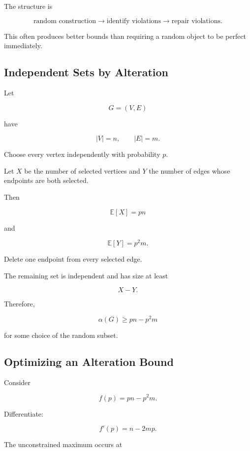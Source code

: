 The structure is

\[
\boxed{
\text{random construction}
\longrightarrow
\text{identify violations}
\longrightarrow
\text{repair violations}.
}
\]

This often produces better bounds than requiring a random object to be
perfect immediately.

\subsection{Independent Sets by Alteration}
\label{subsec:independent-set-alteration}

Let

\[
G=(V,E)
\]

have

\[
|V|=n,
\qquad
|E|=m.
\]

Choose every vertex independently with probability \(p\).

Let \(X\) be the number of selected vertices and \(Y\) the number of
edges whose endpoints are both selected.

Then

\[
\mathbb{E}[X]=pn
\]

and

\[
\mathbb{E}[Y]=p^2m.
\]

Delete one endpoint from every selected edge.

The remaining set is independent and has size at least

\[
X-Y.
\]

Therefore,

\[
\boxed{
\alpha(G)
\geq
pn-p^2m
}
\]

for some choice of the random subset.

\subsection{Optimizing an Alteration Bound}
\label{subsec:optimizing-alteration}

Consider

\[
f(p)
=
pn-p^2m.
\]

Differentiate:

\[
f'(p)
=
n-2mp.
\]

The unconstrained maximum occurs at

